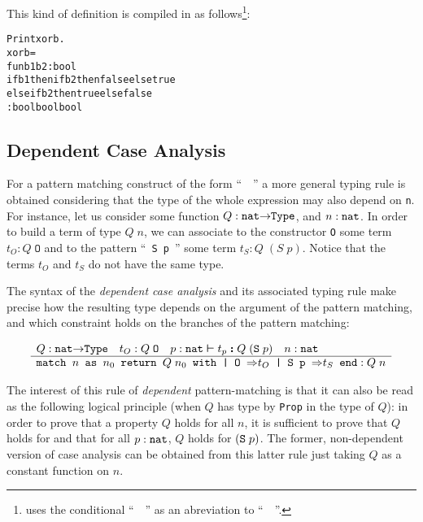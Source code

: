 \documentclass[11pt]{article}
\begin{document}
This kind of definition is compiled in {\coq} as follows\footnote{{\coq} uses
the conditional ``~~'' as an abreviation to
``~~''.}:

\begin{alltt}
Print xorb.
xorb =
fun b1 b2 : bool {\funarrow}
if b1 then if b2 then false else true
      else if b2 then true else false
     : bool {\arrow} bool {\arrow} bool
\end{alltt}

\subsection{Dependent Case Analysis}
\label{DependentCase}

For a pattern matching construct of the form
``~~'' a more general typing rule
is obtained considering that the type of the whole expression
may also depend on \texttt{n}.
  For instance, let us consider some function
$Q:\texttt{nat}\mbox{$\rightarrow$}{}\texttt{Type}$, and $n:\mbox{\texttt{nat}}$.
In order to build a term of type $Q\;n$, we can associate
to the constructor \texttt{O} some term $t_O: Q\;\texttt{O}$ and to
the pattern ``~\texttt{S p}~''  some term $t_S : Q\;(S\;p)$.
Notice that the terms $t_O$ and $t_S$ do not have the same type.

The syntax of the \emph{dependent case analysis} and its
associated typing rule make precise how the resulting
type depends on the argument of the pattern matching, and
which constraint holds on the branches of the pattern matching:

\label{Prod-sup-rule}
\[
\begin{array}[t]{l}
Q: \texttt{nat}{\mbox{$\rightarrow$}}\texttt{Type}\quad{t_O}:{{Q\;\texttt{O}}}  \quad
\mbox{$p:\texttt{nat} \boldsymbol{\large \vdash} t_p \boldsymbol{:} {Q\;(\texttt{S}\;p)} $} \quad n:\texttt{nat} \\
\hline
{\texttt{match \(n\) as \(n\sb{0}\) return \(Q\;n\sb{0}\) with | O \mbox{$\Rightarrow$}\(t\sb{O}\) | S p \mbox{$\Rightarrow$}\(t\sb{S}\) end}}:{{Q\;n}}
\end{array}
\]


The interest of this rule of \textsl{dependent} pattern-matching is
that it can also be read as the following logical principle (when $Q$ has type 
by \texttt{Prop} in the type of $Q$): in order to prove
that a property $Q$ holds for all $n$, it is sufficient to prove that
$Q$ holds for {\Z} and that for all $p:\texttt{nat}$, $Q$ holds for
$(\texttt{S}\;p)$.  The former, non-dependent version of case analysis can
be obtained from this latter rule just taking $Q$ as a constant
function on $n$.
\end{document}
